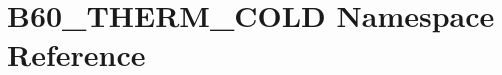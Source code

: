 \hypertarget{namespace_b60___t_h_e_r_m___c_o_l_d}{}\section{B60\+\_\+\+T\+H\+E\+R\+M\+\_\+\+C\+O\+LD Namespace Reference}
\label{namespace_b60___t_h_e_r_m___c_o_l_d}
